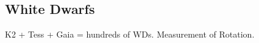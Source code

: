 {\color{red} \subsection{White Dwarfs}}
K2 + Tess + Gaia = hundreds of WDs. Measurement of Rotation.

